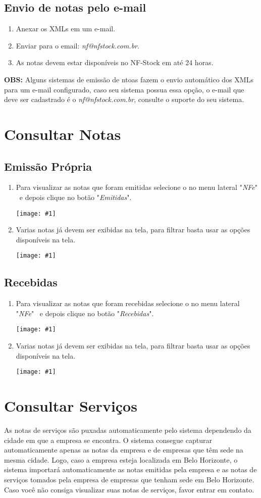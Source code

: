 \documentclass{article}
\newcommand{\imagem}[2]{
  \begin{center}
    \texttt{[image: \#1]}
  \end{center}
}
\begin{document}
\subsection{Envio de notas pelo e-mail}
\begin{enumerate}
  \item Anexar os XMLs em um e-mail.
  \item Enviar para o email: \textit{nf@nfstock.com.br}.
  \item As notas devem estar disponíveis no NF-Stock em até 24 horas.
\end{enumerate}
\textbf{OBS:} Alguns sistemas de emissão de ntoas fazem o envio automático dos XMLs para um e-mail configurado, caso seu sistema possua essa opção, o e-mail que deve ser cadastrado é o \textit{nf@nfstock.com.br}, consulte o suporte do seu sistema.
\pagebreak
\section{Consultar Notas}
\label{sec:notas}

\subsection{Emissão Própria}
\begin{enumerate}
  \item Para visualizar as notas que foram emitidas selecione o no menu lateral "\textit{NFe}" \ e depois clique no botão "\textit{Emitidas}". \imagem{menu-nfe.PNG}{.25}
  \item Varias notas já devem ser exibidas na tela, para filtrar basta usar as opções disponíveis na tela. \imagem{filtro-nfe-emit.PNG}{1}
\end{enumerate}

\subsection{Recebidas}
\begin{enumerate}
  \item Para visualizar as notas que foram recebidas selecione o no menu lateral "\textit{NFe}" \ e depois clique no botão "\textit{Recebidas}". \imagem{menu-nfe.PNG}{.25}
  \item Varias notas já devem ser exibidas na tela, para filtrar basta usar as opções disponíveis na tela. \imagem{filtro-nfe-rec.PNG}{1}
\end{enumerate}

\section{Consultar Serviços}
As notas de serviços são puxadas automaticamente pelo sistema dependendo da cidade em que a empresa se encontra. O sistema consegue capturar automaticamente apenas as notas da empresa e de empresas que têm sede na mesma cidade. Logo, caso a empresa esteja localizada em Belo Horizonte, o sistema importará automaticamente as notas emitidas pela empresa e as notas de serviços tomados pela empresa de empresas que tenham sede em Belo Horizonte. Caso você não consiga visualizar suas notas de serviços, favor entrar em contato.
\label{sec:prestados}
\end{document}
